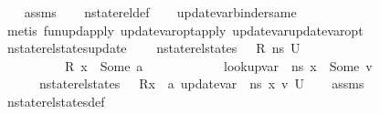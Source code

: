 \begin{isabellebody}
%
\isadelimproof
\ \ %
\endisadelimproof
%
\isatagproof
{}\isamarkupfalse%
\ assms\isanewline
\ \ \isamarkupfalse%
\ nstate{\isacharunderscore}{\kern0pt}rel{\isacharunderscore}{\kern0pt}def\isanewline
\ \ \isamarkupfalse%
\ update{\isacharunderscore}{\kern0pt}var{\isacharunderscore}{\kern0pt}binder{\isacharunderscore}{\kern0pt}same\isanewline
\ \ \isamarkupfalse%
\ {\isacharparenleft}{\kern0pt}metis\ fun{\isacharunderscore}{\kern0pt}upd{\isacharunderscore}{\kern0pt}apply\ update{\isacharunderscore}{\kern0pt}var{\isacharunderscore}{\kern0pt}opt{\isacharunderscore}{\kern0pt}apply\ update{\isacharunderscore}{\kern0pt}var{\isacharunderscore}{\kern0pt}update{\isacharunderscore}{\kern0pt}var{\isacharunderscore}{\kern0pt}opt{\isacharparenright}{\kern0pt}%
\endisatagproof
{\isafoldproof}%
%
\isadelimproof
\isanewline
%
\endisadelimproof
\isanewline
{}\isamarkupfalse%
\ nstate{\isacharunderscore}{\kern0pt}rel{\isacharunderscore}{\kern0pt}states{\isacharunderscore}{\kern0pt}update{\isacharunderscore}{\kern0pt}{}{\isacharcolon}{\kern0pt}\ \isanewline
\ \ \ {\isachardoublequoteopen}nstate{\isacharunderscore}{\kern0pt}rel{\isacharunderscore}{\kern0pt}states\ {\isasymLambda}\ {\isasymLambda}{\isacharprime}{\kern0pt}\ R\ ns{}\ U{\isachardoublequoteclose}\ \ \isanewline
\ \ \ \ \ \ \ \ \ \ {\isachardoublequoteopen}R\ x{\isacharprime}{\kern0pt}\ {\isacharequal}{\kern0pt}\ Some\ a{\isachardoublequoteclose}\ \ \isanewline
\ \ \ \ \ \ \ \ \ \ {\isachardoublequoteopen}lookup{\isacharunderscore}{\kern0pt}var\ {\isasymLambda}\ ns{}\ x{\isacharprime}{\kern0pt}\ {\isacharequal}{\kern0pt}\ Some\ v{\isachardoublequoteclose}\isanewline
\ \ \ \ \ \ {\isachardoublequoteopen}nstate{\isacharunderscore}{\kern0pt}rel{\isacharunderscore}{\kern0pt}states\ {\isasymLambda}\ {\isasymLambda}{\isacharprime}{\kern0pt}\ {\isacharparenleft}{\kern0pt}R{\isacharparenleft}{\kern0pt}x\ {\isasymmapsto}\ a{\isacharparenright}{\kern0pt}{\isacharparenright}{\kern0pt}\ {\isacharparenleft}{\kern0pt}update{\isacharunderscore}{\kern0pt}var\ {\isasymLambda}\ ns{}\ x\ v{\isacharparenright}{\kern0pt}\ U{\isachardoublequoteclose}\isanewline
%
\isadelimproof
\ \ %
\endisadelimproof
%
\isatagproof
{}\isamarkupfalse%
\ assms\isanewline
\ \ \isamarkupfalse%
\ nstate{\isacharunderscore}{\kern0pt}rel{\isacharunderscore}{\kern0pt}states{\isacharunderscore}{\kern0pt}def\isanewline

\end{isabellebody}
